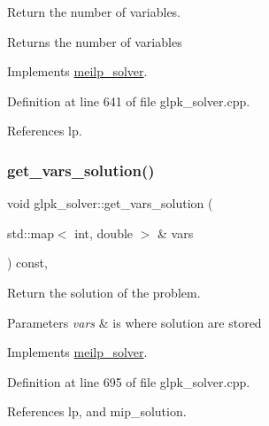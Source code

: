 Return the number of variables. 

\begin{DoxyReturn}{Returns}
the number of variables 
\end{DoxyReturn}


Implements \hyperlink{classmeilp__solver_abcbe8b799332dd2f29c042488e3655ab}{meilp\+\_\+solver}.



Definition at line 641 of file glpk\+\_\+solver.\+cpp.



References lp.

\mbox{\label{classglpk__solver_a7164da0eb8d9fed8b7cefe548b2f6ee3}} 
\subsubsection{\texorpdfstring{get\+\_\+vars\+\_\+solution()}{get\_vars\_solution()}}
{\footnotesize\ttfamily void glpk\+\_\+solver\+::get\+\_\+vars\+\_\+solution (\begin{DoxyParamCaption}\item[{std\+::map$<$ int, double $>$ \&}]{vars }\end{DoxyParamCaption}) const\hspace{0.3cm}{\ttfamily [override]}, {\ttfamily [virtual]}}



Return the solution of the problem. 


\begin{DoxyParams}{Parameters}
{\em vars} & is where solution are stored \\
\hline
\end{DoxyParams}


Implements \hyperlink{classmeilp__solver_a2d89a5dd8ecf6e2e9dc290f7088f05e9}{meilp\+\_\+solver}.



Definition at line 695 of file glpk\+\_\+solver.\+cpp.



References lp, and mip\+\_\+solution.

\mbox{\label{classglpk__solver_a1b0f80ab919e5b0b702f050e52835c9a}} 
